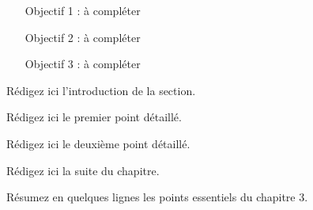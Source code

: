 %
%


\begin{objectifs}
\begin{itemize}
  \item [Objectif 1 : à compléter]
  \item [Objectif 2 : à compléter]
  \item [Objectif 3 : à compléter]
\end{itemize}
\end{objectifs}


Rédigez ici l'introduction de la section.


Rédigez ici le premier point détaillé.


Rédigez ici le deuxième point détaillé.


Rédigez ici la suite du chapitre.

\begin{resume}
Résumez en quelques lignes les points essentiels du chapitre 3.
\end{resume}
